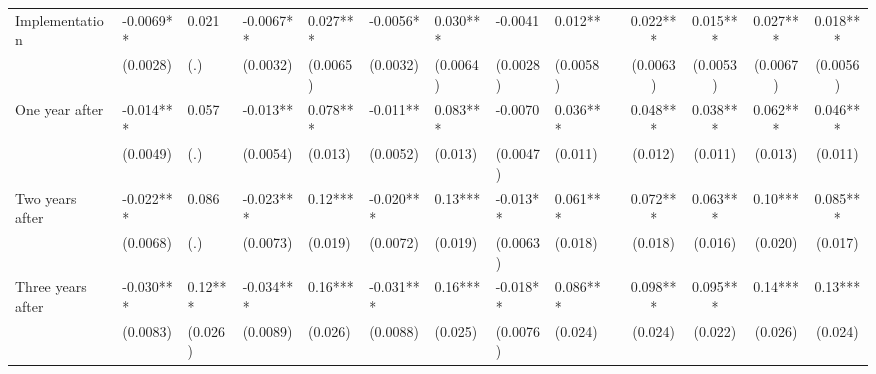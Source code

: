 \begin{tabular}{lccccrrrrrcccc}
Implementation & \multicolumn{1}{l}{-0.0069**} & \multicolumn{1}{l}{0.021} & \multicolumn{1}{l}{-0.0067**} & \multicolumn{1}{l}{0.027***} & \multicolumn{1}{l}{-0.0056*} & \multicolumn{1}{l}{0.030***} & \multicolumn{1}{l}{-0.0041} & \multicolumn{1}{l}{0.012**} &       & 0.022*** & 0.015*** & 0.027*** & 0.018*** \\
      & \multicolumn{1}{l}{(0.0028)} & \multicolumn{1}{l}{(.)} & \multicolumn{1}{l}{(0.0032)} & \multicolumn{1}{l}{(0.0065)} & \multicolumn{1}{l}{(0.0032)} & \multicolumn{1}{l}{(0.0064)} & \multicolumn{1}{l}{(0.0028)} & \multicolumn{1}{l}{(0.0058)} &       & (0.0063) & (0.0053) & (0.0067) & (0.0056) \\
One year after & \multicolumn{1}{l}{-0.014***} & \multicolumn{1}{l}{0.057} & \multicolumn{1}{l}{-0.013**} & \multicolumn{1}{l}{0.078***} & \multicolumn{1}{l}{-0.011**} & \multicolumn{1}{l}{0.083***} & \multicolumn{1}{l}{-0.0070} & \multicolumn{1}{l}{0.036***} &       & 0.048*** & 0.038*** & 0.062*** & 0.046*** \\
      & \multicolumn{1}{l}{(0.0049)} & \multicolumn{1}{l}{(.)} & \multicolumn{1}{l}{(0.0054)} & \multicolumn{1}{l}{(0.013)} & \multicolumn{1}{l}{(0.0052)} & \multicolumn{1}{l}{(0.013)} & \multicolumn{1}{l}{(0.0047)} & \multicolumn{1}{l}{(0.011)} &       & (0.012) & (0.011) & (0.013) & (0.011) \\
Two years after & \multicolumn{1}{l}{-0.022***} & \multicolumn{1}{l}{0.086} & \multicolumn{1}{l}{-0.023***} & \multicolumn{1}{l}{0.12***} & \multicolumn{1}{l}{-0.020***} & \multicolumn{1}{l}{0.13***} & \multicolumn{1}{l}{-0.013**} & \multicolumn{1}{l}{0.061***} &       & 0.072*** & 0.063*** & 0.10*** & 0.085*** \\
      & \multicolumn{1}{l}{(0.0068)} & \multicolumn{1}{l}{(.)} & \multicolumn{1}{l}{(0.0073)} & \multicolumn{1}{l}{(0.019)} & \multicolumn{1}{l}{(0.0072)} & \multicolumn{1}{l}{(0.019)} & \multicolumn{1}{l}{(0.0063)} & \multicolumn{1}{l}{(0.018)} &       & (0.018) & (0.016) & (0.020) & (0.017) \\
Three years after & \multicolumn{1}{l}{-0.030***} & \multicolumn{1}{l}{0.12***} & \multicolumn{1}{l}{-0.034***} & \multicolumn{1}{l}{0.16***} & \multicolumn{1}{l}{-0.031***} & \multicolumn{1}{l}{0.16***} & \multicolumn{1}{l}{-0.018**} & \multicolumn{1}{l}{0.086***} &       & 0.098*** & 0.095*** & 0.14*** & 0.13*** \\
      & \multicolumn{1}{l}{(0.0083)} & \multicolumn{1}{l}{(0.026)} & \multicolumn{1}{l}{(0.0089)} & \multicolumn{1}{l}{(0.026)} & \multicolumn{1}{l}{(0.0088)} & \multicolumn{1}{l}{(0.025)} & \multicolumn{1}{l}{(0.0076)} & \multicolumn{1}{l}{(0.024)} &       & (0.024) & (0.022) & (0.026) & (0.024) \\

\end{tabular}
